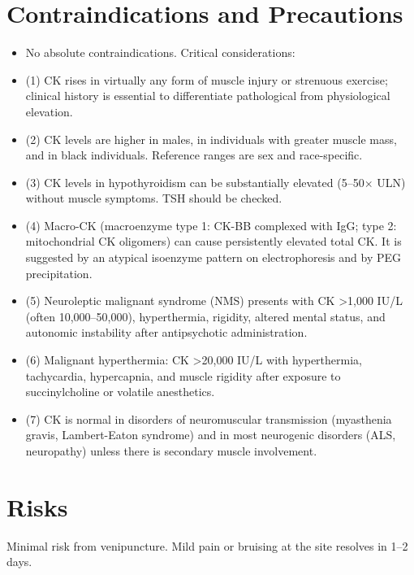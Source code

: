 \section*{Contraindications and Precautions}
\begin{itemize}
  \item No absolute contraindications. Critical considerations:
  \item (1) CK rises in virtually any form of muscle injury or strenuous exercise; clinical history is essential to differentiate pathological from physiological elevation.
  \item (2) CK levels are higher in males, in individuals with greater muscle mass, and in black individuals. Reference ranges are sex and race-specific.
  \item (3) CK levels in hypothyroidism can be substantially elevated (5--50$\times$ ULN) without muscle symptoms. TSH should be checked.
  \item (4) Macro-CK (macroenzyme type 1: CK-BB complexed with IgG; type 2: mitochondrial CK oligomers) can cause persistently elevated total CK. It is suggested by an atypical isoenzyme pattern on electrophoresis and by PEG precipitation.
  \item (5) Neuroleptic malignant syndrome (NMS) presents with CK >1,000 IU/L (often 10,000--50,000), hyperthermia, rigidity, altered mental status, and autonomic instability after antipsychotic administration.
  \item (6) Malignant hyperthermia: CK >20,000 IU/L with hyperthermia, tachycardia, hypercapnia, and muscle rigidity after exposure to succinylcholine or volatile anesthetics.
  \item (7) CK is normal in disorders of neuromuscular transmission (myasthenia gravis, Lambert-Eaton syndrome) and in most neurogenic disorders (ALS, neuropathy) unless there is secondary muscle involvement.
\end{itemize}
\section*{Risks}
Minimal risk from venipuncture. Mild pain or bruising at the site resolves in 1--2 days.


